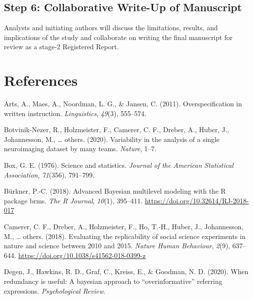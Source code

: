\documentclass[
  english,
  man,floatsintext]{apa6}
\begin{document}
\hypertarget{step-6-collaborative-write-up-of-manuscript}{%
\subsection{Step 6: Collaborative Write-Up of Manuscript}\label{step-6-collaborative-write-up-of-manuscript}}

Analysts and initiating authors will discuss the limitations, results, and implications of the study and collaborate on writing the final manuscript for review as a stage-2 Registered Report.

\newpage

\hypertarget{references}{%
\section{References}\label{references}}

\begingroup
\setlength{\parindent}{-0.5in}
\setlength{\leftskip}{0.5in}

\hypertarget{refs}{}
\leavevmode\hypertarget{ref-arts2011overspecification}{}%
Arts, A., Maes, A., Noordman, L. G., \& Jansen, C. (2011). Overspecification in written instruction. \emph{Linguistics}, \emph{49}(3), 555--574.

\leavevmode\hypertarget{ref-botvinik2020variability}{}%
Botvinik-Nezer, R., Holzmeister, F., Camerer, C. F., Dreber, A., Huber, J., Johannesson, M., \ldots{} others. (2020). Variability in the analysis of a single neuroimaging dataset by many teams. \emph{Nature}, 1--7.

\leavevmode\hypertarget{ref-box1976science}{}%
Box, G. E. (1976). Science and statistics. \emph{Journal of the American Statistical Association}, \emph{71}(356), 791--799.

\leavevmode\hypertarget{ref-brms}{}%
Bürkner, P.-C. (2018). Advanced Bayesian multilevel modeling with the R package brms. \emph{The R Journal}, \emph{10}(1), 395--411. \url{https://doi.org/10.32614/RJ-2018-017}

\leavevmode\hypertarget{ref-camerer2018evaluating}{}%
Camerer, C. F., Dreber, A., Holzmeister, F., Ho, T.-H., Huber, J., Johannesson, M., \ldots{} others. (2018). Evaluating the replicability of social science experiments in nature and science between 2010 and 2015. \emph{Nature Human Behaviour}, \emph{2}(9), 637--644. \url{https://doi.org/10.1038/s41562-018-0399-z}

\leavevmode\hypertarget{ref-degen2020redundancy}{}%
Degen, J., Hawkins, R. D., Graf, C., Kreiss, E., \& Goodman, N. D. (2020). When redundancy is useful: A bayesian approach to ``overinformative'' referring expressions. \emph{Psychological Review}.
\end{document}
